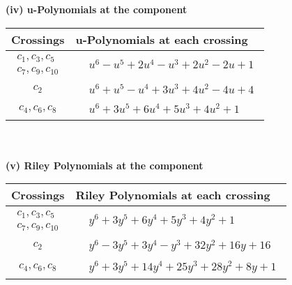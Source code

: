 \documentclass[1p]{elsarticle_modified}
\theoremstyle{definition}
\begin{document}
\newpage\renewcommand{\arraystretch}{1}
\flushleft \textbf{(iv) u-Polynomials at the component}\newline \\
\begin{tabular}{m{50pt}|m{274pt}}
Crossings & \hspace{64pt}u-Polynomials at each crossing \\
\hline $$\begin{aligned}c_{1},c_{3},c_{5}\\c_{7},c_{9},c_{10}\end{aligned}$$&$\begin{aligned}
&u^6- u^5+2 u^4- u^3+2 u^2-2 u+1
\end{aligned}$\\
\hline $$\begin{aligned}c_{2}\end{aligned}$$&$\begin{aligned}
&u^6+u^5- u^4+3 u^3+4 u^2-4 u+4
\end{aligned}$\\
\hline $$\begin{aligned}c_{4},c_{6},c_{8}\end{aligned}$$&$\begin{aligned}
&u^6+3 u^5+6 u^4+5 u^3+4 u^2+1
\end{aligned}$\\
\hline
\end{tabular}\\~\\
\newpage\renewcommand{\arraystretch}{1}
\flushleft \textbf{(v) Riley Polynomials at the component}\newline \\
\begin{tabular}{m{50pt}|m{274pt}}
Crossings & \hspace{64pt}Riley Polynomials at each crossing \\
\hline $$\begin{aligned}c_{1},c_{3},c_{5}\\c_{7},c_{9},c_{10}\end{aligned}$$&$\begin{aligned}
&y^6+3 y^5+6 y^4+5 y^3+4 y^2+1
\end{aligned}$\\
\hline $$\begin{aligned}c_{2}\end{aligned}$$&$\begin{aligned}
&y^6-3 y^5+3 y^4- y^3+32 y^2+16 y+16
\end{aligned}$\\
\hline $$\begin{aligned}c_{4},c_{6},c_{8}\end{aligned}$$&$\begin{aligned}
&y^6+3 y^5+14 y^4+25 y^3+28 y^2+8 y+1
\end{aligned}$\\
\hline
\end{tabular}\\~\\
\end{document}
